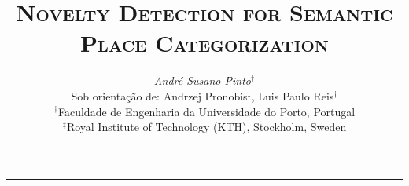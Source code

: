 \documentclass[9pt,a4paper]{extarticle}
\begin{document}
\title{\vspace*{-8mm}\textbf{\textsc{Novelty Detection for Semantic Place Categorization}}}
\author{\emph{André Susano Pinto}$^\dag$\\[2mm]
        \small{Sob orientação de: Andrzej Pronobis$^\ddag$, Luis Paulo Reis$^\dag$}\\
        \small{$^\dag$Faculdade de Engenharia da Universidade do Porto, Portugal}\\
        \small{$^\ddag$Royal Institute of Technology (KTH), Stockholm, Sweden}}
\date{}
\maketitle
\thispagestyle{empty}

\vspace*{-4mm}\noindent\rule{\textwidth}{0.4pt}\vspace*{4mm}
\end{document}
